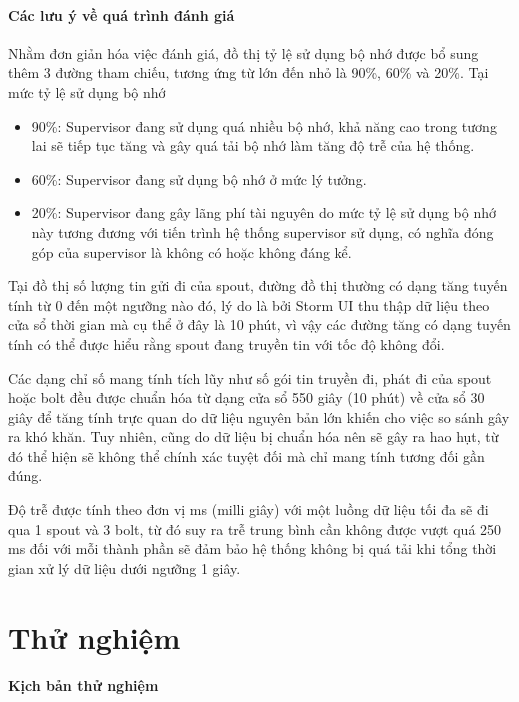 \paragraph{Các lưu ý về quá trình đánh giá}

Nhằm đơn giản hóa việc đánh giá, đồ thị tỷ lệ sử dụng bộ nhớ được bổ sung thêm 3 đường tham chiếu, tương ứng từ lớn đến nhỏ là 90\%, 60\% và 20\%. Tại mức tỷ lệ sử dụng bộ nhớ

\begin{itemize}
    \item 90\%: Supervisor đang sử dụng quá nhiều bộ nhớ, khả năng cao trong tương lai sẽ tiếp tục tăng và gây quá tải bộ nhớ làm tăng độ trễ của hệ thống.
    \item 60\%: Supervisor đang sử dụng bộ nhớ ở mức lý tưởng.
    \item 20\%: Supervisor đang gây lãng phí tài nguyên do mức tỷ lệ sử dụng bộ nhớ này tương đương với tiến trình hệ thống supervisor sử dụng, có nghĩa đóng góp của supervisor là không có hoặc không đáng kể.
\end{itemize}

Tại đồ thị số lượng tin gửi đi của spout, đường đồ thị thường có dạng tăng tuyến tính từ 0 đến một ngưỡng nào đó, lý do là bởi Storm UI thu thập dữ liệu theo cửa sổ thời gian mà cụ thể ở đây là 10 phút, vì vậy các đường tăng có dạng tuyến tính có thể được hiểu rằng spout đang truyền tin với tốc độ không đổi.

Các dạng chỉ số mang tính tích lũy như số gói tin truyền đi, phát đi của spout hoặc bolt đều được chuẩn hóa từ dạng cửa sổ 550 giây (10 phút) về cửa sổ 30 giây để tăng tính trực quan do dữ liệu nguyên bản lớn khiến cho việc so sánh gây ra khó khăn. Tuy nhiên, cũng do dữ liệu bị chuẩn hóa nên sẽ gây ra hao hụt, từ đó thể hiện sẽ không thể chính xác tuyệt đối mà chỉ mang tính tương đối gần đúng.

Độ trễ được tính theo đơn vị ms (milli giây) với một luồng dữ liệu tối đa sẽ đi qua 1 spout và 3 bolt, từ đó suy ra trễ trung bình cần không được vượt quá 250 ms đối với mỗi thành phần sẽ đảm bảo hệ thống không bị quá tải khi tổng thời gian xử lý dữ liệu dưới ngưỡng 1 giây.

\section{Thử nghiệm}

\paragraph{Kịch bản thử nghiệm}

